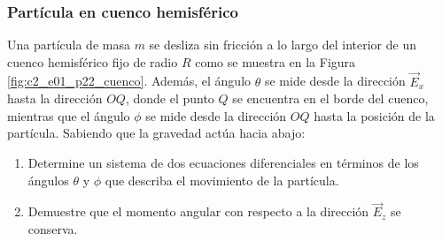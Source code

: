 \subsubsection{Partícula en cuenco hemisférico}

Una partícula de masa $m$ se desliza sin fricción a lo largo del interior de un cuenco hemisférico fijo de radio $R$ como se muestra en la Figura \ref{fig:c2_e01_p22_cuenco}. Además, el ángulo $\theta$ se mide desde la dirección $\vec{E}_x$ hasta la dirección $OQ$, donde el punto $Q$ se encuentra en el borde del cuenco, mientras que el ángulo $\phi$ se mide desde la dirección $OQ$ hasta la posición de la partícula. Sabiendo que la gravedad actúa hacia abajo:

\begin{enumerate}
    \item Determine un sistema de dos ecuaciones diferenciales en términos de los ángulos $\theta$ y $\phi$ que describa el movimiento de la partícula.
    \item Demuestre que el momento angular con respecto a la dirección $\vec{E}_z$ se conserva.
\end{enumerate}


